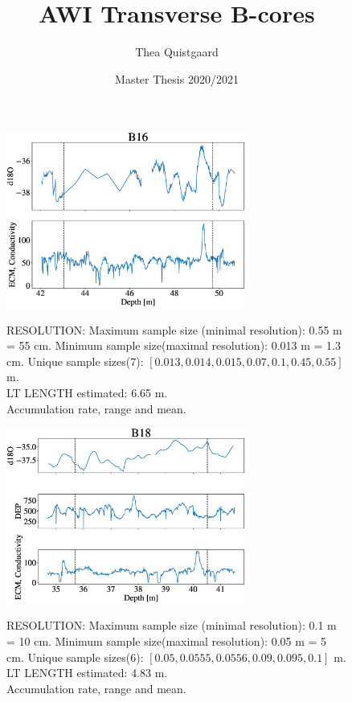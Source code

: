 \documentclass[11pt]{article}
\title{AWI Transverse B-cores}
\author{Thea Quistgaard}
\date{Master Thesis 2020/2021}
\begin{document}
\maketitle

\begin{figure}[h]
	\centering
	\includegraphics[width=0.7\textwidth]{Core_LT_B16.eps}
		\label{fig:B16}
	\caption{RESOLUTION: Maximum sample size (minimal resolution): 0.55 m = 55 cm. Minimum sample size(maximal resolution): 0.013 m = 1.3 cm. Unique sample sizes(7): $[0.013, 0.014, 0.015, 0.07,  0.1, 0.45, 0.55]$ m.\\
	LT LENGTH estimated: 6.65 m.\\
	Accumulation rate, range and mean.}
\end{figure}

\begin{figure}[h]
	\centering
	\includegraphics[width=0.7\textwidth]{Core_LT_B18.eps}
	\label{fig:B18}
	\caption{RESOLUTION: Maximum sample size (minimal resolution): 0.1 m = 10 cm. Minimum sample size(maximal resolution): 0.05 m = 5 cm. Unique sample sizes(6): $[0.05, 0.0555, 0.0556, 0.09, 0.095, 0.1]$ m.\\
	LT LENGTH estimated: 4.83 m.\\
	Accumulation rate, range and mean.}
\end{figure}
\end{document}
